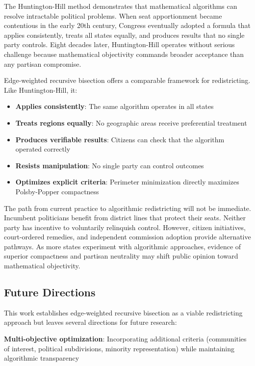 The Huntington-Hill method demonstrates that mathematical algorithms can resolve intractable political problems. When seat apportionment became contentious in the early 20th century, Congress eventually adopted a formula that applies consistently, treats all states equally, and produces results that no single party controls. Eight decades later, Huntington-Hill operates without serious challenge because mathematical objectivity commands broader acceptance than any partisan compromise.

Edge-weighted recursive bisection offers a comparable framework for redistricting. Like Huntington-Hill, it:

\begin{itemize}
\item \textbf{Applies consistently}: The same algorithm operates in all states
\item \textbf{Treats regions equally}: No geographic areas receive preferential treatment
\item \textbf{Produces verifiable results}: Citizens can check that the algorithm operated correctly
\item \textbf{Resists manipulation}: No single party can control outcomes
\item \textbf{Optimizes explicit criteria}: Perimeter minimization directly maximizes Polsby-Popper compactness
\end{itemize}

The path from current practice to algorithmic redistricting will not be immediate. Incumbent politicians benefit from district lines that protect their seats. Neither party has incentive to voluntarily relinquish control. However, citizen initiatives, court-ordered remedies, and independent commission adoption provide alternative pathways. As more states experiment with algorithmic approaches, evidence of superior compactness and partisan neutrality may shift public opinion toward mathematical objectivity.

\subsection{Future Directions}

This work establishes edge-weighted recursive bisection as a viable redistricting approach but leaves several directions for future research:

\textbf{Multi-objective optimization}: Incorporating additional criteria (communities of interest, political subdivisions, minority representation) while maintaining algorithmic transparency

